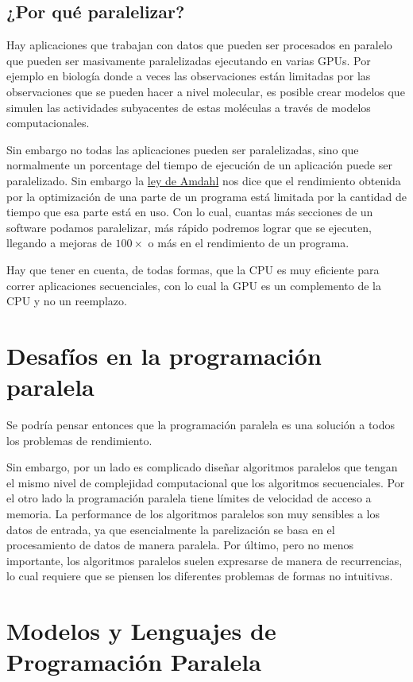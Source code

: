 \subsection*{¿Por qué paralelizar?}

Hay aplicaciones que trabajan con datos que pueden ser procesados en paralelo que pueden ser masivamente paralelizadas
ejecutando en varias GPUs. Por ejemplo en biología donde a veces las observaciones están limitadas por las observaciones
que se pueden hacer a nivel molecular, es posible crear modelos que simulen las actividades subyacentes de estas
moléculas a través de modelos computacionales.

Sin embargo no todas las aplicaciones pueden ser paralelizadas, sino que normalmente un porcentage del tiempo de
ejecución de un aplicación puede ser paralelizado. Sin embargo la \href{https://es.wikipedia.org/wiki/Ley_de_Amdahl}{ley
de Amdahl} nos dice que el rendimiento obtenida por la optimización de una parte de un programa está limitada por la
cantidad de tiempo que esa parte está en uso. Con lo cual, cuantas más secciones de un software podamos paralelizar, más
rápido podremos lograr que se ejecuten, llegando a mejoras de $100\times$ o más en el rendimiento de un programa.

Hay que tener en cuenta, de todas formas, que la CPU es muy eficiente para correr aplicaciones secuenciales, con lo cual
la GPU es un complemento de la CPU y no un reemplazo.

\section*{Desafíos en la programación paralela}

Se podría pensar entonces que la programación paralela es una solución a todos los problemas de rendimiento.

Sin embargo, por un lado es complicado diseñar algoritmos paralelos que tengan el mismo nivel de complejidad
computacional que los algoritmos secuenciales. Por el otro lado la programación paralela tiene límites de velocidad de
acceso a memoria. La performance de los algoritmos paralelos son muy sensibles a los datos de entrada, ya que
esencialmente la parelización se basa en el procesamiento de datos de manera paralela. Por último, pero no menos
importante, los algoritmos paralelos suelen expresarse de manera de recurrencias, lo cual requiere que se piensen los
diferentes problemas de formas no intuitivas.

\section*{Modelos y Lenguajes de Programación Paralela}

